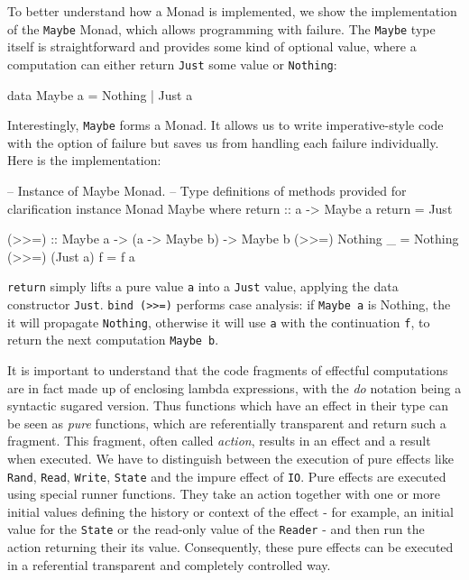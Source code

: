 To better understand how a Monad is implemented, we show the implementation of the \texttt{Maybe} Monad, which allows programming with failure. The \texttt{Maybe} type itself is straightforward and provides some kind of optional value, where a computation can either return \texttt{Just} some value or \texttt{Nothing}:

\begin{HaskellCode}
data Maybe a = Nothing | Just a
\end{HaskellCode}

Interestingly, \texttt{Maybe} forms a Monad. It allows us to write imperative-style code with the option of failure but saves us from handling each failure individually. Here is the implementation:

\begin{HaskellCode}
-- Instance of Maybe Monad.
-- Type definitions of methods provided for clarification
instance Monad Maybe where
  return :: a -> Maybe a
  return = Just
  
  (>>=) :: Maybe a -> (a -> Maybe b) -> Maybe b
  (>>=) Nothing _  = Nothing
  (>>=) (Just a) f = f a 
\end{HaskellCode}

\texttt{return} simply lifts a pure value \texttt{a} into a \texttt{Just} value, applying the data constructor \texttt{Just}. \texttt{bind (>>=)} performs case analysis: if \texttt{Maybe a} is Nothing, the it will propagate \texttt{Nothing}, otherwise it will use \texttt{a} with the continuation \texttt{f}, to return the next computation \texttt{Maybe b}.

\medskip

It is important to understand that the code fragments of effectful computations are in fact  made up of enclosing lambda expressions, with the \textit{do} notation being a syntactic sugared version. Thus functions which have an effect in their type can be seen as \textit{pure} functions, which are referentially transparent and return such a fragment. This fragment, often called \textit{action}, results in an effect and a result when executed. We have to distinguish between the execution of pure effects like \texttt{Rand}, \texttt{Read}, \texttt{Write}, \texttt{State} and the impure effect of \texttt{IO}. Pure effects are executed using special runner functions. They take an action together with one or more initial values defining the history or context of the effect - for example, an initial value for the \texttt{State} or the read-only value of the \texttt{Reader} - and then run the action returning their its value. Consequently, these pure effects can be executed in a referential transparent and completely controlled way.

